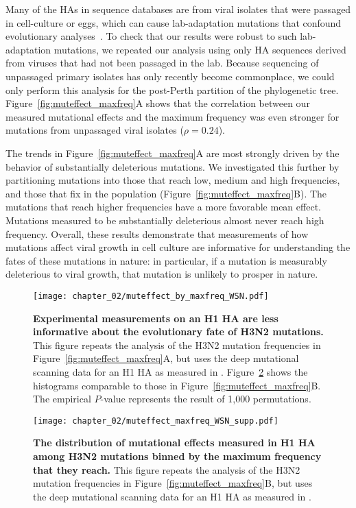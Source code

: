 Many of the HAs in sequence databases are from viral isolates that were passaged in cell-culture or eggs, which can cause lab-adaptation mutations that confound evolutionary analyses~\citep{McWhite:2016fe}.
To check that our results were robust to such lab-adaptation mutations, we repeated our analysis using only HA sequences derived from viruses that had not been passaged in the lab.
Because sequencing of unpassaged primary isolates has only recently become commonplace, we could only perform this analysis for the post-Perth partition of the phylogenetic tree.
Figure~\ref{fig:muteffect_maxfreq}A shows that the correlation between our measured mutational effects and the maximum frequency was even stronger for mutations from unpassaged viral isolates ($\rho = 0.24$).

The trends in Figure~\ref{fig:muteffect_maxfreq}A are most strongly driven by the behavior of substantially deleterious mutations.
We investigated this further by partitioning mutations into those that reach low, medium and high frequencies, and those that fix in the population (Figure~\ref{fig:muteffect_maxfreq}B).
The mutations that reach higher frequencies have a more favorable mean effect.
Mutations measured to be substantially deleterious almost never reach high frequency.
Overall, these results demonstrate that measurements of how mutations affect viral growth in cell culture are informative for understanding the fates of these mutations in nature: in particular, if a mutation is measurably deleterious to viral growth, that mutation is unlikely to prosper in nature.

\begin{figure}
  \centering
  \texttt{[image: chapter\_02/muteffect\_by\_maxfreq\_WSN.pdf]}
  \caption{\label{fig:muteffect_maxfreq_WSN}
    {\bf Experimental measurements on an H1 HA are less informative about the evolutionary fate of H3N2 mutations.}
    This figure repeats the analysis of the H3N2 mutation frequencies in Figure~\ref{fig:muteffect_maxfreq}A, but uses the deep mutational scanning data for an H1 HA as measured in \citep{Doud:2016gm}.
    Figure~\ref{suppfig:muteffect_maxfreq_WSN_supp} shows the histograms comparable to those in Figure~\ref{fig:muteffect_maxfreq}B.
    The empirical $P$-value represents the result of 1,000 permutations.
  }
\end{figure}

\begin{figure}
\centerline{\texttt{[image: chapter\_02/muteffect\_maxfreq\_WSN\_supp.pdf]}}
\caption{\label{suppfig:muteffect_maxfreq_WSN_supp}
{\bf The distribution of mutational effects measured in H1 HA among H3N2 mutations binned by the maximum frequency that they reach.}
This figure repeats the analysis of the H3N2 mutation frequencies in Figure~\ref{fig:muteffect_maxfreq}B, but uses the deep mutational scanning data for an H1 HA as measured in \citet{Doud:2016gm}.
}
\end{figure}

